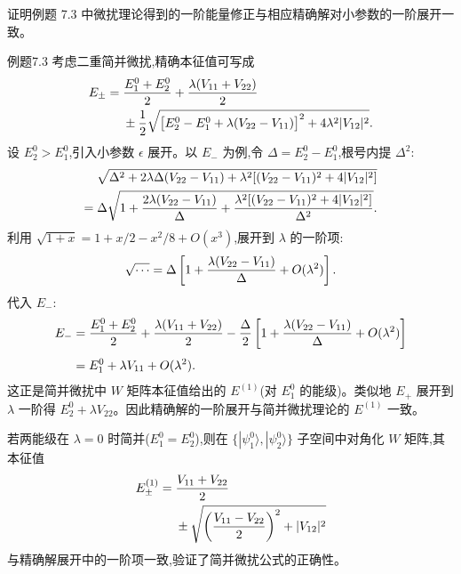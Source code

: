 \begin{question}
证明例题 7.3 中微扰理论得到的一阶能量修正与相应精确解对小参数的一阶展开一致。
\begin{solution}
例题7.3 考虑二重简并微扰,精确本征值可写成
\[
\begin{aligned}E_\pm={}&{E_1^0+E_2^0\over2}+{\lambda(V_{11}+V_{22})\over2}\\&\pm{1\over2}\sqrt{\bigl[E_2^0-E_1^0+\lambda(V_{22}-V_{11})\bigr]^2+4\lambda^2|V_{12}|^2}.\end{aligned}
\]
设 $E_2^0>E_1^0$,引入小参数 $\epsilon$ 展开。以 $E_-$ 为例,令 $\Delta=E_2^0-E_1^0$,根号内提 $\Delta^2$:
\[
\begin{aligned}\sqrt{\Delta^2+2\lambda\Delta(V_{22}-V_{11})+\lambda^2[(V_{22}-V_{11})^2+4|V_{12}|^2]}\\=\Delta\sqrt{1+{2\lambda(V_{22}-V_{11})\over\Delta}+{\lambda^2[(V_{22}-V_{11})^2+4|V_{12}|^2]\over\Delta^2}}.\end{aligned}
\]
利用 $\sqrt{1+x}=1+x/2-x^2/8+O(x^3)$,展开到 $\lambda$ 的一阶项:
\[
\sqrt{\cdots}=\Delta\left[1+{\lambda(V_{22}-V_{11})\over\Delta}+O(\lambda^2)\right].
\]
代入 $E_-$:
\[
\begin{aligned}
E_-&={E_1^0+E_2^0\over2}+{\lambda(V_{11}+V_{22})\over2}
-{\Delta\over2}\left[1+{\lambda(V_{22}-V_{11})\over\Delta}+O(\lambda^2)\right] \\[4pt]
&=E_1^0+\lambda V_{11}+O(\lambda^2).
\end{aligned}
\]
这正是简并微扰中 $W$ 矩阵本征值给出的 $E^{(1)}$(对 $E_1^0$ 的能级)。类似地 $E_+$ 展开到 $\lambda$ 一阶得 $E_2^0+\lambda V_{22}$。因此精确解的一阶展开与简并微扰理论的 $E^{(1)}$ 一致。

若两能级在 $\lambda=0$ 时简并($E_1^0=E_2^0$),则在 $\{|\psi_1^0\rangle,|\psi_2^0\rangle\}$ 子空间中对角化 $W$ 矩阵,其本征值
\[
\begin{aligned}E_\pm^{(1)}={}&{V_{11}+V_{22}\over2}\\&\pm\sqrt{\left({V_{11}-V_{22}\over2}\right)^2+|V_{12}|^2}\end{aligned}
\]
与精确解展开中的一阶项一致,验证了简并微扰公式的正确性。
\end{solution}
\end{question}


